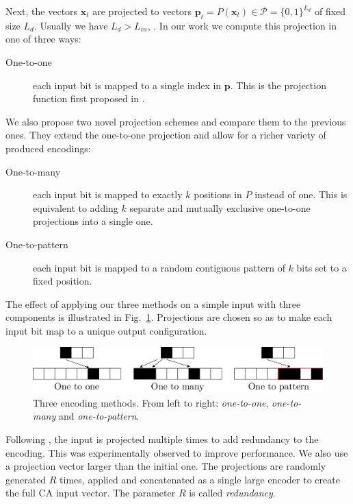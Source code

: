 Next, the vectors $\mathbf{x}_{t}$ are projected to vectors
$\mathbf{p}_{t} = P(\mathbf{x}_{t}) \in \mathcal{P} = {\{0, 1\}}^{L_{d}}$ of
fixed size $L_{d}$. Usually we have $L_{d} > L_{in}$, . In our work we compute
this projection in one of three ways:

\begin{description}
  \item[One-to-one] each input bit is mapped to a single index in $\mathbf{p}$.
        This is the projection function first proposed in
        \textcite{yilmazReservoirComputingUsing2014}.
\end{description}

We also propose two novel projection schemes and compare them to the previous
ones. They extend the one-to-one projection and allow for a richer variety of
produced encodings:

\begin{description}
  \item[One-to-many] each input bit is mapped to exactly $k$ positions in $P$
        instead of one. This is equivalent to adding $k$ separate and mutually
        exclusive one-to-one projections into a single one.
  \item[One-to-pattern] each input bit is mapped to a random contiguous pattern
        of $k$ bits set to a fixed position.
\end{description}

The effect of applying our three methods on a simple input with three components
is illustrated in Fig.~\ref{fig:enc_meth}. Projections are chosen so as to make
each input bit map to a unique output configuration.

\begin{figure}[htbp]
  \centering
  \includegraphics[width=\linewidth]{figures/encoding_methods.pdf}
  \caption{Three encoding methods. From left to right: \emph{one-to-one},
    \emph{one-to-many} and \emph{one-to-pattern}.}\label{fig:enc_meth}
\end{figure}

Following \parencite{yilmazReservoirComputingUsing2014,
  nicheleReservoirComputingUsing2017, nicheleDeepLearningCellular2017}, the
input is projected multiple times to add redundancy to the encoding. This was
experimentally observed to improve performance. We also use a projection vector
larger than the initial one. The projections are randomly generated $R$ times,
applied and concatenated as a single large encoder to create the full CA input
vector. The parameter $R$ is called \emph{redundancy}.

